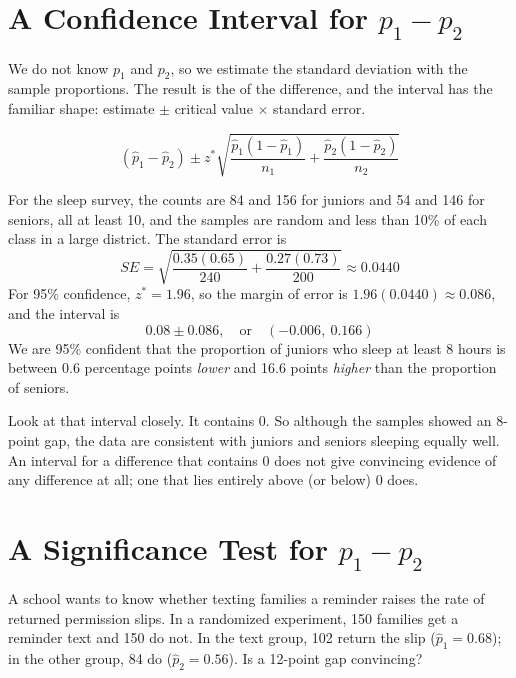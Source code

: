 \section{A Confidence Interval for $p_1 - p_2$}
We do not know $p_1$ and $p_2$, so we estimate the standard deviation with the sample
proportions. The result is the  of the difference, and the interval
has the familiar shape: estimate $\pm$ critical value $\times$ standard error.

\begin{mdframed}[style = important, frametitle = {Two-Proportion $z$-Interval}]
$$(\hat{p}_1 - \hat{p}_2) \pm z^*\sqrt{\frac{\hat{p}_1(1-\hat{p}_1)}{n_1} + \frac{\hat{p}_2(1-\hat{p}_2)}{n_2}}$$
\end{mdframed}

\begin{mdframed}[frametitle = {Example}, style = important]
For the sleep survey, the counts are 84 and 156 for juniors and 54 and 146 for seniors, all
at least 10, and the samples are random and less than 10\% of each class in a large district.
The standard error is
$$SE = \sqrt{\frac{0.35(0.65)}{240} + \frac{0.27(0.73)}{200}} \approx 0.0440$$
For 95\% confidence, $z^* = 1.96$, so the margin of error is $1.96(0.0440) \approx 0.086$, and the
interval is
$$0.08 \pm 0.086, \quad\text{or}\quad (-0.006,\ 0.166)$$
We are 95\% confident that the proportion of juniors who sleep at least 8 hours is between 0.6
percentage points \emph{lower} and 16.6 points \emph{higher} than the proportion of seniors.
\end{mdframed}

Look at that interval closely. It contains 0. So although the samples showed an 8-point gap, the
data are consistent with juniors and seniors sleeping equally well. An interval for a
difference that contains 0 does not give convincing evidence of any difference at all; one
that lies entirely above (or below) 0 does.

\section{A Significance Test for $p_1 - p_2$}
A school wants to know whether texting families a reminder raises the rate of returned
permission slips. In a randomized experiment, 150 families get a reminder text and 150 do not.
In the text group, 102 return the slip ($\hat{p}_1 = 0.68$); in the other group, 84 do
($\hat{p}_2 = 0.56$). Is a 12-point gap convincing?

